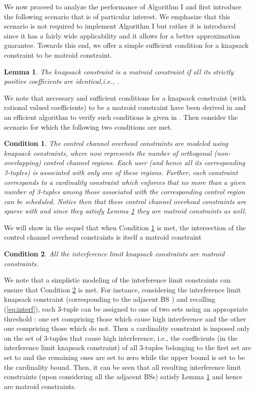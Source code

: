 \documentclass[11pt] {article}
\newtheorem{lemma}{Lemma}
\newtheorem{condition}{Condition}
\begin{document}
We now proceed to analyze the performance of Algorithm I and first introduce the following scenario that is of particular interest. We emphasize that this scenario is not required to implement Algorithm I but rather it is introduced since it has a fairly wide applicability and it allows for  a better approximation guarantee. Towards this end, we offer a simple sufficient condition for a knapsack constraint to be matroid constraint.
  \begin{lemma}\label{assump:1}
  The  knapsack constraint is a matroid constraint if all its strictly positive coefficients are identical,i.e., .
  \end{lemma}
 We  note that
necessary and sufficient conditions for a knapsack constraint (with rational valued coefficients) to be a matroid constraint have been derived in \cite{wolsey:knap} and an efficient algorithm to verify such conditions is given in \cite{barcia:knap}.
Then consider the scenario for which the following two conditions are met.
 \begin{condition}\label{assump1}
   The control channel overhead  constraints are modeled using  knapsack constraints,   where   now represents the number of orthogonal (non-overlapping) control channel regions. Each  user (and hence all its corresponding 3-tuples) is associated with only one of these regions. Further, each constraint corresponds  to a  cardinality constraint   which enforces that no more than a given number of  3-tuples among those associated with the corresponding control region can be scheduled. Notice then that these  control channel overhead constraints are sparse with  and since they satisfy Lemma \ref{assump:1} they are   matroid constraints as well. \end{condition}
   We will show in the sequel that when Condition \ref{assump1} is met, the intersection of the  control channel overhead constraints is itself a matroid constraint
  \begin{condition}\label{assump2}
  All the  interference limit knapsack constraints are matroid constraints.
  \end{condition}
  We note that a simplistic modeling of the interference limit constraints can ensure that Condition \ref{assump2} is met.
   For instance, considering the  interference limit knapsack constraint (corresponding to the adjacent  BS ) and recalling (\ref{eq:interf}), each 3-tuple   can be assigned to one of two sets using an appropriate threshold : one set comprising those which cause high interference  and the other one comprising those which do not. Then a cardinality constraint is imposed only on the set of 3-tuples that cause high interference, i.e., the coefficients (in the  interference limit knapsack constraint) of all 3-tuples belonging to the first set are set to   and the remaining ones are set to zero while the upper bound  is set to be the cardinality bound. Then, it can be seen that all resulting interference limit constraints (upon considering all the  adjacent BSs)  satisfy Lemma \ref{assump:1} and hence are   matroid constraints.
\end{document}
